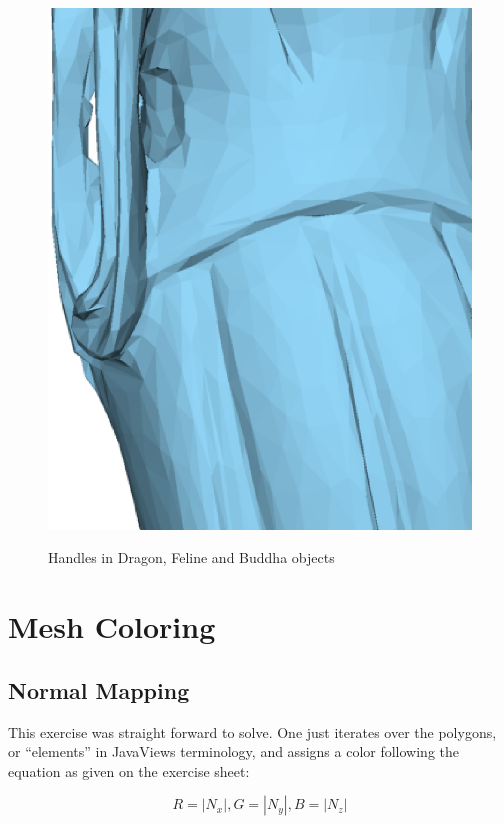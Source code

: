 \documentclass[a4paper,10pt,notitlepage]{scrreprt}
\begin{document}
\begin{figure}
{    \includegraphics[scale=0.4]{budda2.eps}}

  \label{fig:handles}
  \caption{Handles in Dragon, Feline and Buddha objects}
\end{figure}

\chapter{Mesh Coloring}

\section{Normal Mapping}

This exercise was straight forward to solve. One just iterates over the
polygons, or ``elements'' in JavaViews terminology, and assigns a color
following the equation as given on the exercise sheet:

\begin{equation}
  R = |N_x|, G = |N_y|, B = |N_z|
 \label{eq:normal-mapping}
\end{equation}
\end{document}
